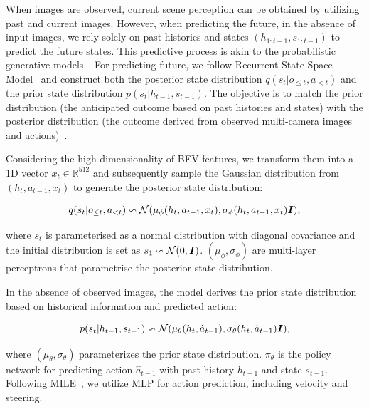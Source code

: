 When images are observed, current scene perception can be obtained by utilizing past and current images. However, when predicting the future, in the absence of input images, we rely solely on past histories and states $(h_{1:t-1}, s_{1:t-1})$ to predict the future states. This predictive process is akin to the probabilistic generative models~\cite{vae}. For predicting future, we follow Recurrent State-Space Model~\cite{plas_wm} and construct both the posterior state distribution $q(s_t|o_{\leq t},a_{< t})$ and the prior state distribution $p(s_t|h_{t-1},s_{t-1})$. The objective is to match the prior distribution (the anticipated outcome based on past histories and states) with the posterior distribution (the outcome derived from observed multi-camera images and actions)~\cite{mile}.  

Considering the high dimensionality of BEV features, we transform them into a 1D vector $x_t\in \mathbb{R}^{512}$ and subsequently sample the Gaussian distribution from $(h_t, a_{t-1},x_t)$ to generate the posterior state distribution:

\begin{footnotesize} 
	\begin{equation} \label{post}
	q(s_t|o_{\leq t},a_{< t})\backsim \mathcal{N}(\mu _{\phi }(h_t,a_{t-1},x_t),\sigma _{\phi }(h_t, a_{t-1},x_t)\textbf{\textit{I}}),
	\end{equation} 
\end{footnotesize}
where $s_t$ is parameterised as a normal distribution with diagonal covariance and the initial distribution is set as $s_1\backsim \mathcal{N}(0,\textbf{\textit{I}})$. $(\mu _{\phi }, \sigma _{\phi })$ are multi-layer perceptrons that parametrise the posterior state distribution. 

In the absence of observed images, the model derives the prior state distribution based on historical information and predicted action:

\begin{footnotesize} 
	\begin{equation} \label{prior}
	p(s_t|h_{t-1},s_{t-1})\backsim \mathcal{N}(\mu _\theta (h_t,\hat{a}_{t-1}),\sigma_\theta (h_t,\hat{a}_{t-1})\textbf{\textit{I}}),
	\end{equation} 
\end{footnotesize}
where $(\mu _{\theta }, \sigma _{\theta })$ parameterizes the prior state distribution. $\pi _\theta$ is the policy network for predicting action $\hat{a}_{t-1}$ with past history $h_{t-1}$ and state $s_{t-1}$. Following MILE~\cite{mile}, we utilize MLP for action prediction, including velocity and steering.
